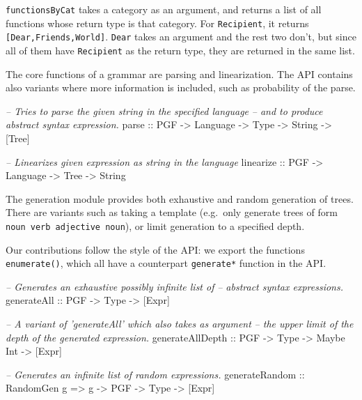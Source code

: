 \documentclass[]{article}
\newenvironment{Shaded}{\begin{snugshade}}{\end{snugshade}}
\newcommand{\DataTypeTok}[1]{\textcolor[rgb]{0.13,0.29,0.53}{{#1}}}
\newcommand{\CommentTok}[1]{\textcolor[rgb]{0.56,0.35,0.01}{\textit{{#1}}}}
\newcommand{\OtherTok}[1]{\textcolor[rgb]{0.56,0.35,0.01}{{#1}}}
\newcommand{\NormalTok}[1]{{#1}}
\begin{document}
\texttt{functionsByCat} takes a category as an argument, and returns a
list of all functions whose return type is that category. For
\texttt{Recipient}, it returns \texttt{{[}Dear,Friends,World{]}}.
\texttt{Dear} takes an argument and the rest two don't, but since all of
them have \texttt{Recipient} as the return type, they are returned in
the same list.

The core functions of a grammar are parsing and linearization. The API
contains also variants where more information is included, such as
probability of the parse.

\begin{Shaded}
\begin{Highlighting}[]
\CommentTok{-- Tries to parse the given string in the specified language}
\CommentTok{-- and to produce abstract syntax expression.}
\OtherTok{parse ::} \DataTypeTok{PGF} \OtherTok{->} \DataTypeTok{Language} \OtherTok{->} \DataTypeTok{Type} \OtherTok{->} \DataTypeTok{String} \OtherTok{->} \NormalTok{[}\DataTypeTok{Tree}\NormalTok{]}

\CommentTok{-- Linearizes given expression as string in the language}
\OtherTok{linearize ::} \DataTypeTok{PGF} \OtherTok{->} \DataTypeTok{Language} \OtherTok{->} \DataTypeTok{Tree} \OtherTok{->} \DataTypeTok{String}
\end{Highlighting}
\end{Shaded}

The generation module provides both exhaustive and random generation of
trees. There are variants such as taking a template (e.g.~only generate
trees of form \texttt{noun verb adjective noun}), or limit generation to
a specified depth.

Our contributions follow the style of the API: we export the functions
\texttt{enumerate()}, which all have a counterpart \texttt{generate*}
function in the API.

\begin{Shaded}
\begin{Highlighting}[]
\CommentTok{-- Generates an exhaustive possibly infinite list of}
\CommentTok{-- abstract syntax expressions.}
\OtherTok{generateAll ::} \DataTypeTok{PGF} \OtherTok{->} \DataTypeTok{Type} \OtherTok{->} \NormalTok{[}\DataTypeTok{Expr}\NormalTok{]}

\CommentTok{-- A variant of 'generateAll' which also takes as argument}
\CommentTok{-- the upper limit of the depth of the generated expression.}
\OtherTok{generateAllDepth ::} \DataTypeTok{PGF} \OtherTok{->} \DataTypeTok{Type} \OtherTok{->} \DataTypeTok{Maybe} \DataTypeTok{Int} \OtherTok{->} \NormalTok{[}\DataTypeTok{Expr}\NormalTok{]}

\CommentTok{-- Generates an infinite list of random  expressions.}
\OtherTok{generateRandom ::} \DataTypeTok{RandomGen} \NormalTok{g }\OtherTok{=>} \NormalTok{g }\OtherTok{->} \DataTypeTok{PGF} \OtherTok{->} \DataTypeTok{Type} \OtherTok{->} \NormalTok{[}\DataTypeTok{Expr}\NormalTok{]}
\end{Highlighting}
\end{Shaded}
\end{document}
